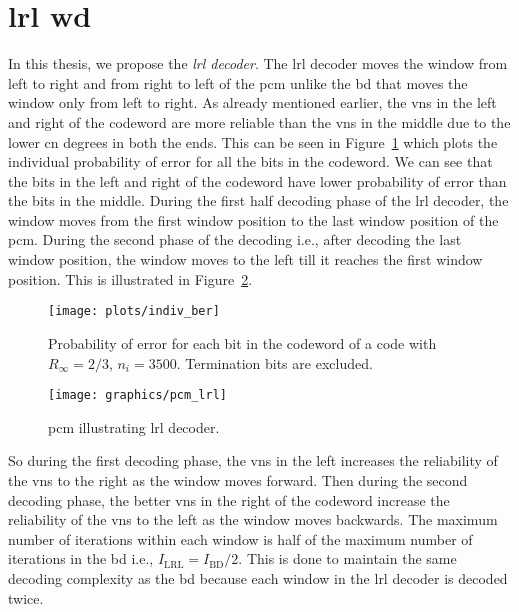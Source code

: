 \section{\acrlong{lrl} \acrlong{wd}}
In this thesis, we propose the \emph{\gls{lrl} decoder}. The \gls{lrl} decoder moves the window from left to right and from right to left of the \gls{pcm} unlike the \gls{bd} that moves the window only from left to right. As already mentioned earlier, the \glspl{vn} in the left and right of the codeword are more reliable than the \glspl{vn} in the middle due to the lower \gls{cn} degrees in both the ends. This can be seen in Figure~\ref{fig:indiv_ber} which plots the individual probability of error for all the bits in the codeword. We can see that the bits in the left and right of the codeword have lower probability of error than the bits in the middle. During the first half decoding phase of the \gls{lrl} decoder, the window moves from the first window position to the last window position of the \gls{pcm}. During the second phase of the decoding i.e., after decoding the last window position, the window moves to the left till it reaches the first window position. This is illustrated in Figure~\ref{fig:pcm_lrl}.
\begin{figure}[htbp]
  \centering
  \texttt{[image: plots/indiv\_ber]}
  \caption{Probability of error for each bit in the codeword of a code with $R_\infty=2/3$, $n_i=3500$. Termination bits are excluded.}
  \label{fig:indiv_ber}
\end{figure}

\begin{figure}[htbp]
  \centering
  \texttt{[image: graphics/pcm\_lrl]}
  \caption{\gls{pcm} illustrating \gls{lrl} decoder.}
  \label{fig:pcm_lrl}
\end{figure}
So during the first decoding phase, the \glspl{vn} in the left increases the reliability of the \glspl{vn} to the right as the window moves forward. Then during the second decoding phase, the better \glspl{vn} in the right of the codeword increase the reliability of the \glspl{vn} to the left as the window moves backwards. The maximum number of iterations within each window is half of the maximum number of iterations in the \gls{bd} i.e., $I_{\text{LRL}}=I_{\text{BD}}/2$. This is done to maintain the same decoding complexity as the \gls{bd} because each window in the \gls{lrl} decoder is decoded twice.

